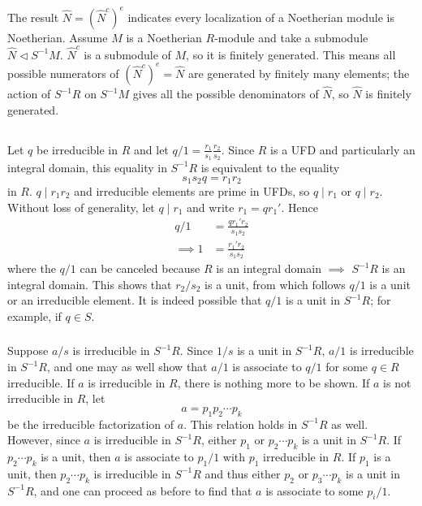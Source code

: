 \documentclass[12pt]{article}
\begin{document}
The result $\hat{N} = (\hat{N}^{c})^{e}$ indicates every localization of a Noetherian module is Noetherian. 
Assume $M$ is a Noetherian $R$-module and take a submodule $\hat{N} \lhd S^{-1}M$. 
$\hat{N}^{c}$ is a submodule of $M$, so it is finitely generated. 
This means all possible numerators of $(\hat{N}^{c})^{e} = \hat{N}$ are generated by finitely many elements; 
the action of $S^{-1}R$ on $S^{-1}M$ gives all the possible denominators of $\hat{N}$, so $\hat{N}$ is finitely generated. 

\subsection{} 
\subsubsection{} 
Let $q$ be irreducible in $R$ and let $q / 1 = \frac{r_1}{s_1} \frac{r_2}{s_2}$. 
Since $R$ is a UFD and particularly an integral domain, this equality in $S^{-1}R$ is equivalent to the equality 
$$s_1 s_2 q = r_1 r_2$$ 
in $R$. 
$q \mid r_1 r_2$ and irreducible elements are prime in UFDs, so $q \mid r_1$ or $q \mid r_2$. 
Without loss of generality, let $q \mid r_1$ and write $r_1 = q r_{1}'$. 
Hence 
\begin{align*}
  q / 1 & = \frac{qr_{1}' r_2}{s_1 s_2}  \\ 
  \implies 1 & = \frac{r_{1}' r_2}{s_1 s_2} 
\end{align*}
where the $q / 1$ can be canceled because $R$ is an integral domain $\implies$ $S^{-1}R$ is an integral domain. 
This shows that $r_2 / s_2$ is a unit, from which follows $q / 1$ is a unit or an irreducible element. 
It is indeed possible that $q / 1$ is a unit in $S^{-1}R$; 
for example, if $q \in S$. 

\subsubsection{}
Suppose $a / s$ is irreducible in $S^{-1}R$. 
Since $1 / s$ is a unit in $S^{-1}R$, $a / 1$ is irreducible in $S^{-1}R$, and one may as well show that $a / 1$ is associate to $q / 1$ for some $q \in R$ irreducible. 
If $a$ is irreducible in $R$, there is nothing more to be shown. 
If $a$ is not irreducible in $R$, let 
$$a = p_1 p_2 \cdots p_k$$
be the irreducible factorization of $a$. 
This relation holds in $S^{-1}R$ as well. 
However, since $a$ is irreducible in $S^{-1}R$, either $p_1$ or $p_2 \cdots p_k$ is a unit in $S^{-1}R$. 
If $p_2 \cdots p_k$ is a unit, then $a$ is associate to $p_1 / 1$ with $p_1$ irreducible in $R$. 
If $p_1$ is a unit, then $p_2 \cdots p_k$ is irreducible in $S^{-1}R$ and thus either $p_2$ or $p_3 \cdots p_k$ is a unit in $S^{-1}R$, and one can proceed as before to find that $a$ is associate to some $p_i / 1$. 
\end{document}
